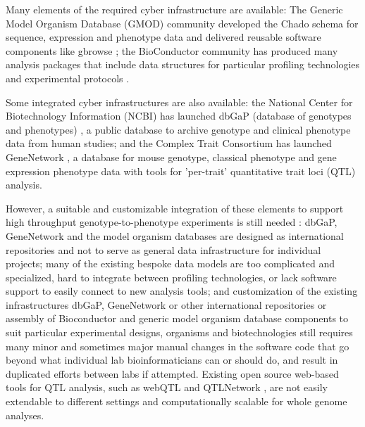 Many elements of the required cyber infrastructure are available: The Generic Model Organism Database (GMOD) 
community developed the Chado schema for sequence, expression and phenotype data \cite{Mungall:2007, OConnor:2008} and delivered reusable 
software components like gbrowse \cite{Stein:2002}; the BioConductor community has produced many analysis packages that 
include data structures for particular profiling technologies and experimental protocols \cite{Gentleman:2004}. 

Some integrated cyber infrastructures are also available: the National Center for Biotechnology Information (NCBI) 
has launched dbGaP (database of genotypes and phenotypes) \cite{Mailman:2007}, a public database to archive genotype 
and clinical phenotype data from human studies; and the Complex Trait Consortium has launched GeneNetwork \cite{GeneNetwork:2004}, 
a database for mouse genotype, classical phenotype and gene expression phenotype data with tools for 'per-trait' quantitative trait loci (QTL) analysis.

However, a suitable and customizable integration of these elements to support high throughput genotype-to-phenotype 
experiments is still needed \cite{Thorisson:2009}: dbGaP, GeneNetwork and the model organism databases are designed 
as international repositories and not to serve as general data infrastructure for individual projects; many of the 
existing bespoke data models are too complicated and specialized, hard to integrate between profiling technologies, 
or lack software support to easily connect to new analysis tools; and customization of the existing infrastructures 
dbGaP, GeneNetwork or other international repositories \cite{Zeng:2007, Hu:2007} or assembly of Bioconductor and 
generic model organism database components to suit particular experimental designs, organisms and biotechnologies 
still requires many minor and sometimes major manual changes in the software code that go beyond what individual 
lab bioinformaticians can or should do, and result in duplicated efforts between labs if attempted. Existing open 
source web-based tools for QTL analysis, such as webQTL \cite{Chesler:2004} and QTLNetwork \cite{Yang:2008}, are 
not easily extendable to different settings and computationally scalable for whole genome analyses.

